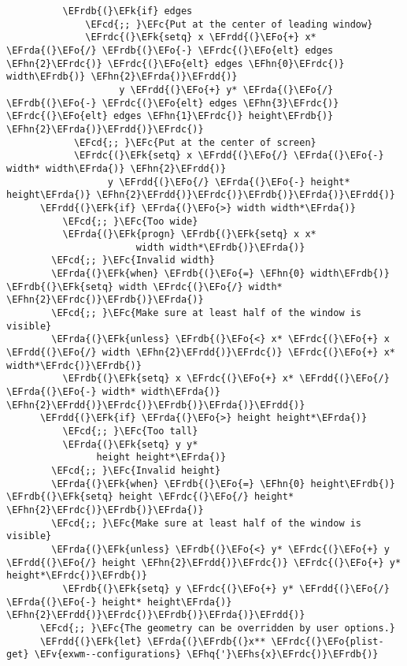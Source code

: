 \documentclass[a4wide,10pt]{article}
\newcommand{\EFc}[1]{\textcolor{EFc}{#1}} %
\newcommand{\EFcd}[1]{\textcolor{EFcd}{#1}} %
\newcommand{\EFk}[1]{\textcolor{EFk}{#1}} %
\newcommand{\EFv}[1]{\textcolor{EFv}{#1}} %
\newcommand{\EFo}[1]{\textcolor{EFo}{#1}} %
\newcommand{\EFhn}[1]{\textcolor{EFhn}{\textbf{#1}}} %
\newcommand{\EFhq}[1]{\textcolor{EFhq}{#1}} %
\newcommand{\EFhs}[1]{\textcolor{EFhs}{#1}} %
\newcommand{\EFrda}[1]{\textcolor{EFrda}{#1}} %
\newcommand{\EFrdb}[1]{\textcolor{EFrdb}{#1}} %
\newcommand{\EFrdc}[1]{\textcolor{EFrdc}{#1}} %
\newcommand{\EFrdd}[1]{\textcolor{EFrdd}{#1}} %
\begin{document}
\begin{Code}
\begin{Verbatim}
          \EFrdb{(}\EFk{if} edges
              \EFcd{;; }\EFc{Put at the center of leading window}
              \EFrdc{(}\EFk{setq} x \EFrdd{(}\EFo{+} x* \EFrda{(}\EFo{/} \EFrdb{(}\EFo{-} \EFrdc{(}\EFo{elt} edges \EFhn{2}\EFrdc{)} \EFrdc{(}\EFo{elt} edges \EFhn{0}\EFrdc{)} width\EFrdb{)} \EFhn{2}\EFrda{)}\EFrdd{)}
                    y \EFrdd{(}\EFo{+} y* \EFrda{(}\EFo{/} \EFrdb{(}\EFo{-} \EFrdc{(}\EFo{elt} edges \EFhn{3}\EFrdc{)} \EFrdc{(}\EFo{elt} edges \EFhn{1}\EFrdc{)} height\EFrdb{)} \EFhn{2}\EFrda{)}\EFrdd{)}\EFrdc{)}
            \EFcd{;; }\EFc{Put at the center of screen}
            \EFrdc{(}\EFk{setq} x \EFrdd{(}\EFo{/} \EFrda{(}\EFo{-} width* width\EFrda{)} \EFhn{2}\EFrdd{)}
                  y \EFrdd{(}\EFo{/} \EFrda{(}\EFo{-} height* height\EFrda{)} \EFhn{2}\EFrdd{)}\EFrdc{)}\EFrdb{)}\EFrda{)}\EFrdd{)}
      \EFrdd{(}\EFk{if} \EFrda{(}\EFo{>} width width*\EFrda{)}
          \EFcd{;; }\EFc{Too wide}
          \EFrda{(}\EFk{progn} \EFrdb{(}\EFk{setq} x x*
                       width width*\EFrdb{)}\EFrda{)}
        \EFcd{;; }\EFc{Invalid width}
        \EFrda{(}\EFk{when} \EFrdb{(}\EFo{=} \EFhn{0} width\EFrdb{)} \EFrdb{(}\EFk{setq} width \EFrdc{(}\EFo{/} width* \EFhn{2}\EFrdc{)}\EFrdb{)}\EFrda{)}
        \EFcd{;; }\EFc{Make sure at least half of the window is visible}
        \EFrda{(}\EFk{unless} \EFrdb{(}\EFo{<} x* \EFrdc{(}\EFo{+} x \EFrdd{(}\EFo{/} width \EFhn{2}\EFrdd{)}\EFrdc{)} \EFrdc{(}\EFo{+} x* width*\EFrdc{)}\EFrdb{)}
          \EFrdb{(}\EFk{setq} x \EFrdc{(}\EFo{+} x* \EFrdd{(}\EFo{/} \EFrda{(}\EFo{-} width* width\EFrda{)} \EFhn{2}\EFrdd{)}\EFrdc{)}\EFrdb{)}\EFrda{)}\EFrdd{)}
      \EFrdd{(}\EFk{if} \EFrda{(}\EFo{>} height height*\EFrda{)}
          \EFcd{;; }\EFc{Too tall}
          \EFrda{(}\EFk{setq} y y*
                height height*\EFrda{)}
        \EFcd{;; }\EFc{Invalid height}
        \EFrda{(}\EFk{when} \EFrdb{(}\EFo{=} \EFhn{0} height\EFrdb{)} \EFrdb{(}\EFk{setq} height \EFrdc{(}\EFo{/} height* \EFhn{2}\EFrdc{)}\EFrdb{)}\EFrda{)}
        \EFcd{;; }\EFc{Make sure at least half of the window is visible}
        \EFrda{(}\EFk{unless} \EFrdb{(}\EFo{<} y* \EFrdc{(}\EFo{+} y \EFrdd{(}\EFo{/} height \EFhn{2}\EFrdd{)}\EFrdc{)} \EFrdc{(}\EFo{+} y* height*\EFrdc{)}\EFrdb{)}
          \EFrdb{(}\EFk{setq} y \EFrdc{(}\EFo{+} y* \EFrdd{(}\EFo{/} \EFrda{(}\EFo{-} height* height\EFrda{)} \EFhn{2}\EFrdd{)}\EFrdc{)}\EFrdb{)}\EFrda{)}\EFrdd{)}
      \EFcd{;; }\EFc{The geometry can be overridden by user options.}
      \EFrdd{(}\EFk{let} \EFrda{(}\EFrdb{(}x** \EFrdc{(}\EFo{plist-get} \EFv{exwm--configurations} \EFhq{'}\EFhs{x}\EFrdc{)}\EFrdb{)}

\end{Verbatim}
\end{Code}
\end{document}

